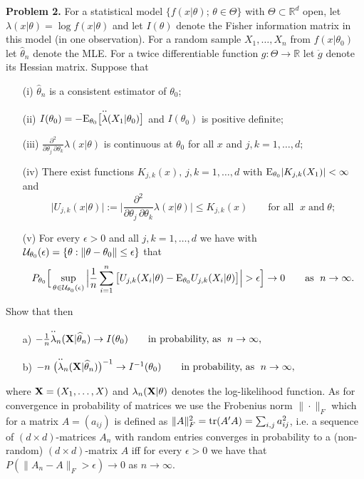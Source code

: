 \documentclass[12pt]{exam}
\begin{document}
\noindent
{\bf Problem 2.} For a statistical model $\{f(x|\theta);\,\theta \in \Theta\}$ with $\Theta \subset {\mathbb R}^d$ open,  let $\lambda(x|\theta) = \log f(x|\theta)$ and let $I(\theta)$ denote the Fisher information matrix in this model (in one observation). For a random sample $X_1,\ldots,X_n$ from $f(x|\theta_0)$ let $\widehat{\theta}_n$ denote the MLE.  For a twice differentiable function $g:\Theta \to {\mathbb R}$ let $\ddot{g}$ denote its Hessian matrix. Suppose that
%
\begin{itemize}
\item[(i)] $\widehat{\theta}_n$ is a consistent estimator of $\theta_0$;
%
\item[(ii)] $I(\theta_0) = -{\rm E}_{\theta_0}\big[\overset{\boldsymbol{\cdot\cdot}}{\lambda}(X_1|\theta_0)\big]$ and $I(\theta_0)$ is positive definite;
%
\item[(iii)] $\frac{\partial^2}{\partial \theta_j\,\partial\theta_k}\lambda(x|\theta)$ is continuous at $\theta_0$ for all $x$ and $j, k = 1,\ldots,d;$ 
%
\item[(iv)] There exist functions $ K_{j,k}(x),\,j,k = 1,\ldots,d$ with ${\rm E}_{\theta_0}|K_{j,k}(X_1)| < \infty$ and 
%
$$\big|U_{j,k}(x|\theta)\big| := \Big|\frac{\partial^2}{\partial \theta_j\,\partial\theta_k}\lambda(x|\theta)\Big|  \le K_{j,k}(x)\qquad\text{for all }\; x\;\text{and}\;\theta;$$
%
\item[(v)] For every $\epsilon > 0$ and all $j,k = 1,\ldots,d$ we have with ${\cal U}_{\theta_0}(\epsilon) = \{\theta: \|\theta - \theta_0\| \le \epsilon\}$ that
%
$$ P_{\theta_0}\Big[ \sup_{\theta \in {\cal U}_{\theta_0}(\epsilon)}\Big| \frac{1}{n}\sum_{i=1}^n\big[U_{j,k}(X_i|\theta) - {\rm E}_{\theta_0}U_{j,k}(X_i|\theta)\big]\Big| > \epsilon \Big] \to 0\qquad\text{as }\; n \to \infty. $$
%
\end{itemize}
%
Show that then
%
\begin{itemize}
\item[a)] \quad $ -\frac{1}{n}\overset{\boldsymbol{\cdot\cdot}}{\lambda}_{n}({\bf X}|\widehat{\theta}_n) \to I(\theta_0)\qquad \text{in probability, as }\; n \to \infty,$
%
\item[b)] \quad $- n\; \big(\overset{\boldsymbol{\cdot\cdot}}{\lambda}_{n}({\bf X}|\widehat{\theta}_n)\big)^{-1} \to I^{-1}(\theta_0)\qquad \text{in probability, as }\; n \to \infty,$
\end{itemize}
%
where ${\bf X} = (X_1,\ldots,X)$ and $\lambda_n({\bf X}|\theta)$ denotes the log-likelihood function. As for convergence in probability of matrices we use the Frobenius norm $\|\cdot\|_F$ which for a matrix $A = (a_{ij})$ is defined as $\|A\|^2_F = {\rm tr}(A^\prime A) = \sum_{i,j} a_{ij}^2$, i.e. a sequence of $(d\times d)$-matrices $A_n$ with random entries converges in probability to a (non-random) $(d\times d)$-matrix $A$ iff for every $\epsilon > 0$ we have that $P(\|A_n - A\|_F > \epsilon) \to 0$ as $n \to \infty$.
\end{document}
